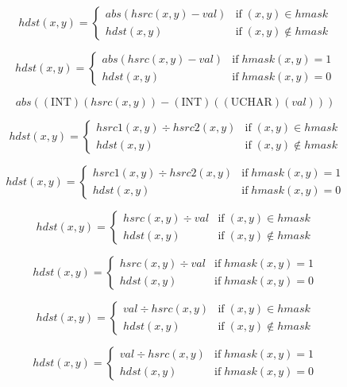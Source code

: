 \documentclass{article}
\begin{document}
{\[ hdst(x,y) = \left\{ \begin{array}{ll} abs( hsrc(x,y) - val) & \mathrm{if} \; (x,y) \in hmask \\ hdst(x,y) & \mathrm{if} \; (x,y) \notin hmask \end{array} \right. \]
\pagebreak

\[hdst(x,y) = \left\{ \begin{array}{ll} abs(hsrc(x,y) - val) & \mathrm{if} \; hmask(x,y) = 1 \\ hdst(x,y) & \mathrm{if} \; hmask(x,y) = 0 \end{array} \right. \]
\pagebreak

\[ abs( ( \mathrm{INT} )(hsrc(x, y)) - ( \mathrm{INT} )( ( \mathrm{UCHAR} )( val ) ) ) \]
\pagebreak

\[ hdst(x,y) = \left\{ \begin{array}{ll} hsrc1(x,y) \div hsrc2(x,y) & \mathrm{if} \; (x,y) \in hmask \\ hdst(x,y) & \mathrm{if} \; (x,y) \notin hmask \end{array} \right. \]
\pagebreak

\[hdst(x,y) = \left\{ \begin{array}{ll} hsrc1(x,y) \div hsrc2(x,y) & \mathrm{if} \; hmask(x,y) = 1 \\ hdst(x,y) & \mathrm{if} \; hmask(x,y) = 0 \end{array} \right. \]
\pagebreak

\[ hdst(x,y) = \left\{ \begin{array}{ll} hsrc(x,y) \div val & \mathrm{if} \; (x,y) \in hmask \\ hdst(x,y) & \mathrm{if} \; (x,y) \notin hmask \end{array} \right. \]
\pagebreak

\[hdst(x,y) = \left\{ \begin{array}{ll} hsrc(x,y) \div val & \mathrm{if} \; hmask(x,y) = 1 \\ hdst(x,y) & \mathrm{if} \; hmask(x,y) = 0 \end{array} \right. \]
\pagebreak

\[ hdst(x,y) = \left\{ \begin{array}{ll} val \div hsrc(x,y) & \mathrm{if} \; (x,y) \in hmask \\ hdst(x,y) & \mathrm{if} \; (x,y) \notin hmask \end{array} \right. \]
\pagebreak

\[hdst(x,y) = \left\{ \begin{array}{ll} val \div hsrc(x,y) & \mathrm{if} \; hmask(x,y) = 1 \\ hdst(x,y) & \mathrm{if} \; hmask(x,y) = 0 \end{array} \right. \]
\pagebreak

}
\end{document}
